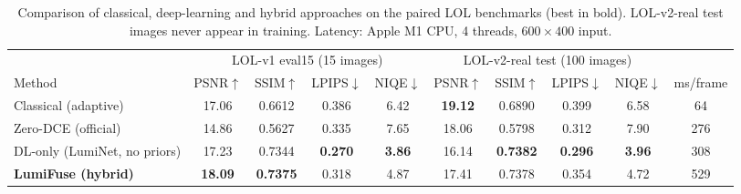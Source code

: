 \begin{table}[t]
\centering
\caption{Comparison of classical, deep-learning and hybrid approaches on the paired LOL benchmarks (best in bold). LOL-v2-real test images never appear in training. Latency: Apple M1 CPU, 4 threads, $600\times400$ input.}
\label{tab:main}
\setlength{\tabcolsep}{5pt}
\begin{tabular}{l cccc cccc c}
\toprule
 & \multicolumn{4}{c}{LOL-v1 eval15 (15 images)} & \multicolumn{4}{c}{LOL-v2-real test (100 images)} & \\
\cmidrule(lr){2-5}\cmidrule(lr){6-9}
Method & PSNR$\uparrow$ & SSIM$\uparrow$ & LPIPS$\downarrow$ & NIQE$\downarrow$ & PSNR$\uparrow$ & SSIM$\uparrow$ & LPIPS$\downarrow$ & NIQE$\downarrow$ & ms/frame \\
\midrule
Classical (adaptive) & 17.06 & 0.6612 & 0.386 & 6.42 & \textbf{19.12} & 0.6890 & 0.399 & 6.58 & 64 \\
Zero-DCE (official) & 14.86 & 0.5627 & 0.335 & 7.65 & 18.06 & 0.5798 & 0.312 & 7.90 & 276 \\
DL-only (LumiNet, no priors) & 17.23 & 0.7344 & \textbf{0.270} & \textbf{3.86} & 16.14 & \textbf{0.7382} & \textbf{0.296} & \textbf{3.96} & 308 \\
\textbf{LumiFuse (hybrid)} & \textbf{18.09} & \textbf{0.7375} & 0.318 & 4.87 & 17.41 & 0.7378 & 0.354 & 4.72 & 529 \\
\bottomrule
\end{tabular}
\end{table}
